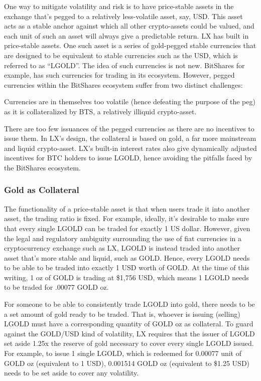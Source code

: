 \documentclass[11pt]{article}
\begin{document}
One way to mitigate volatility and risk is to have price-stable assets in the exchange that's pegged to a relatively less-volatile asset, say, USD. This asset acts as a stable anchor against which all other crypto-assets could be valued, and each unit of such an asset will always give a predictable return. LX has built in price-stable assets. One such asset is a series of gold-pegged stable currencies that are designed to be equivalent to stable currencies such as the USD, which is referred to as ``LGOLD''. The idea of such currencies is not new. BitShares for example, has such currencies for trading in its ecosystem. However, pegged currencies within the BitShares ecosystem suffer from two distinct challenges:


Currencies are in themselves too volatile (hence defeating the purpose of the peg) as it is collateralized by BTS, a relatively illiquid crypto-asset.


There are too few issuances of the pegged currencies as there are no incentives to issue them. In LX's design, the collateral is based on gold, a far more mainstream and liquid crypto-asset. LX's built-in interest rates also give dynamically adjusted incentives for BTC holders to issue LGOLD, hence avoiding the pitfalls faced by the BitShares ecosystem.


\subsubsection{Gold as Collateral}

The functionality of a price-stable asset is that when users trade it into another asset, the trading ratio is fixed. For example, ideally, it's desirable to make sure that every single LGOLD can be traded for exactly 1 US dollar. However, given the legal and regulatory ambiguity surrounding the use of fiat currencies in a cryptocurrency exchange such as LX, LGOLD is instead traded into another asset that's more stable and liquid, such as GOLD. Hence, every LGOLD needs to be able to be traded into exactly 1 USD worth of GOLD. At the time of this writing, 1 oz of GOLD is trading at \$1,756 USD, which means 1 LGOLD needs to be traded for .00077 GOLD oz.


For someone to be able to consistently trade LGOLD into gold, there needs to be a set amount of gold ready to be traded. That is, whoever is issuing (selling) LGOLD must have a corresponding quantity of GOLD oz as collateral. To guard against the GOLD/USD kind of volatility, LX requires that the issuer of LGOLD set aside 1.25x the reserve of gold necessary to cover every single LGOLD issued. For example, to issue 1 single LGOLD, which is redeemed for 0.00077 unit of GOLD oz (equivalent to 1 USD), 0.001514 GOLD oz (equivalent to \$1.25 USD) needs to be set aside to cover any volatility.
\end{document}

